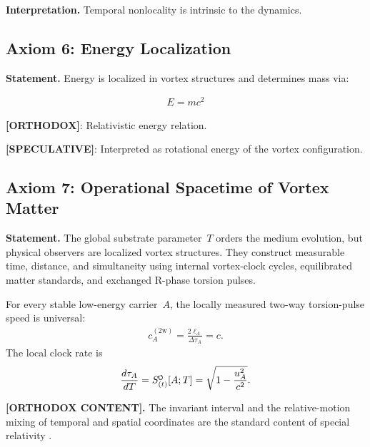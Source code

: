 \documentclass[11pt]{article}
\theoremstyle{definition}
\theoremstyle{plain}
\theoremstyle{remark}
\newcommand{\swirlarrow}{\mathchoice{\mkern-2mu\scriptstyle\boldsymbol{\circlearrowleft}}{\mkern-2mu\scriptstyle\boldsymbol{\circlearrowleft}}{\mkern-2mu\scriptscriptstyle\boldsymbol{\circlearrowleft}}{\mkern-2mu\scriptscriptstyle\boldsymbol{\circlearrowleft}}}
\newcommand{\SwirlClock}{{S_{(t)}^{\swirlarrow}}}
\begin{document}
        \textbf{Interpretation.}
        Temporal nonlocality is intrinsic to the dynamics.
    
    \subsection{Axiom 6: Energy Localization}
        
        \textbf{Statement.}
        Energy is localized in vortex structures and determines mass via:
        
        \begin{align}
            E = m c^2
        \end{align}
        
        \textbf{[ORTHODOX]}: Relativistic energy relation.
        
        \textbf{[SPECULATIVE]}: Interpreted as rotational energy of the vortex configuration.
    
    \subsection{Axiom 7: Operational Spacetime of Vortex Matter}
        \label{axiom:operational_spacetime_vortex_matter}

        \textbf{Statement.}
        The global substrate parameter~\(T\) orders the medium evolution, but physical observers are localized vortex structures. They construct measurable time, distance, and simultaneity using internal vortex-clock cycles, equilibrated matter standards, and exchanged R-phase torsion pulses.

        For every stable low-energy carrier~\(A\), the locally measured two-way torsion-pulse speed is universal:
        \begin{align}
            c_A^{(2\mathrm w)}
            =
            \frac{2\ell_A}{\Delta\tau_A}
            =c.
            \label{eq:axiom_vortex_atom_luminal_torsion}
        \end{align}
        The local clock rate is
        \begin{align}
            \frac{d\tau_A}{dT}
            =
            \SwirlClock[A;T]
            =
            \sqrt{1-\frac{u_A^2}{c^2}}.
            \label{eq:axiom_operational_swirl_clock}
        \end{align}

        \textbf{[ORTHODOX CONTENT].}
        The invariant interval and the relative-motion mixing of temporal and spatial coordinates are the standard content of special relativity \cite{Einstein1905}.
\end{document}
